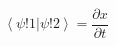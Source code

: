 \documentclass[a4paper,12pt]{article}
\newcommand{\pd}[2]{\frac{\partial #1}{\partial #2}}
\newcommand{\braket}[2]{\left\langle #1 \big| #2 \right\rangle}
\begin{document}
\begin{equation}
\braket{\psi!1}{\psi!2} = \pd{x}{t}
\end{equation}
\end{document}
